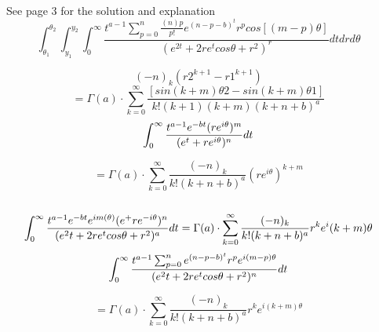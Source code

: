 \documentclass{article}
\begin{document}
\\\
See page 3 for the solution and explanation
\newpage
{}
\[\int_{\theta_1}^{\theta_2}\int_{y_1}^{y_2}\int_{0}^{\infty}\frac{t^{a-1}\sum_{p=0}^{n}\frac{(n)p}{p!}e^{(n-p-b)^{t}}r^{p}cos[(m-p)\theta]}{(e^{2t}+2re^{t}cos \theta +r^{2})^{r}}dtdrd\theta 
\]

\[
(-n)_k(r2^{k+1}-r1^{k+1})
\]
\[
=\Gamma(a) \cdot \sum_{k=0}^{\infty}\frac{[sin(k+m)\theta2-sin(k+m)\theta 1]}{k!(k+1)(k+m)(k+n+b)^{a}}
\]
\[
\int_{0}^{\infty }\frac{t^{a-1}e^{-bt}(re^{i\theta})^m}{(e^t +re^{i\theta})^n}dt\\
\]

\[
=\Gamma(a) \cdot \sum_{k=0}^{\infty }\frac{(-n)_k}{k!(k+n+b)^a}(re^{i\theta})^{k+m}
\]
\\

\[
\int_{0}^{\infty }\frac{t^{a-1}e^{-bt}e^{im(\theta)}(e^ +re^{-i\theta})^n}{(e^2t+2re^t cos\theta +r^2)^a}dt\\
=\Gamma(a)\cdot \sum_{k=0}^{\infty}\frac{(-n)_k}{k!(k+n+b)^a}r^ke^i(k+m)\theta\\  
\]
\[
\int_{0}^{\infty }\frac{t^{a-1}\sum_{p=0}^{n}e^{(n-p-b)^t}r^p e^{i(m-p)\theta}}{(e^2t+2re^tcos\theta +r^2)^n}dt\\
\]


\[
=\Gamma(a)\cdot \sum_{k=0}^{\infty}\frac{(-n)_k}{k!(k+n+b)^a}r^k e^{i(k+m)\theta}
\]
\end{document}
